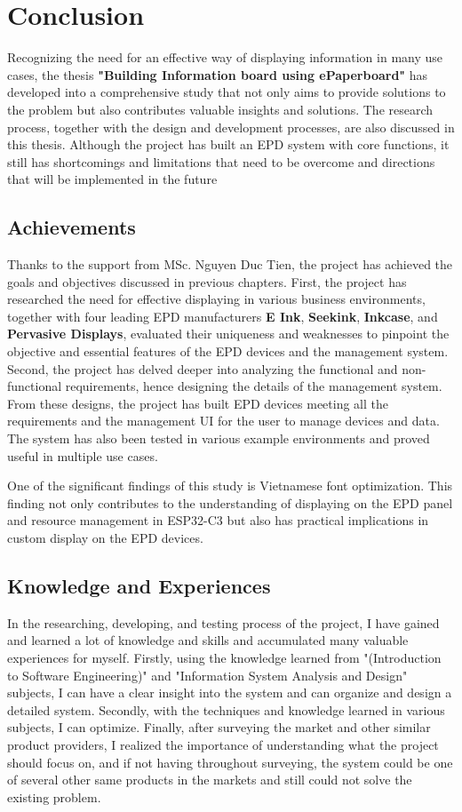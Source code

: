 \documentclass[../Main.tex]{subfiles}
\begin{document}
\section{Conclusion}
Recognizing the need for an effective way of displaying information in many use cases, the thesis \textbf{"Building Information board using ePaperboard"} has developed into a comprehensive study that not only aims to provide solutions to the problem but also contributes valuable insights and solutions. The research process, together with the design and development processes, are also discussed in this thesis. Although the project has built an EPD system with core functions, it still has shortcomings and limitations that need to be overcome and directions that will be implemented in the future

\subsection{Achievements}
Thanks to the support from MSc. Nguyen Duc Tien, the project has achieved the goals and objectives discussed in previous chapters. First, the project has researched the need for effective displaying in various business environments, together with four leading EPD manufacturers \textbf{E Ink}, \textbf{Seekink}, \textbf{Inkcase}, and \textbf{Pervasive Displays}, evaluated their uniqueness and weaknesses to pinpoint the objective and essential features of the EPD devices and the management system. Second, the project has delved deeper into analyzing the functional and non-functional requirements, hence designing the details of the management system. From these designs, the project has built EPD devices meeting all the requirements and the management UI for the user to manage devices and data. The system has also been tested in various example environments and proved useful in multiple use cases.

One of the significant findings of this study is Vietnamese font optimization. This finding not only contributes to the understanding of displaying on the EPD panel and resource management in ESP32-C3 but also has practical implications in custom display on the EPD devices.

\subsection{Knowledge and Experiences}
In the researching, developing, and testing process of the project, I have gained and learned a lot of knowledge and skills and accumulated many valuable experiences for myself. Firstly, using the knowledge learned from "(Introduction to Software Engineering)" and "Information System Analysis and Design" subjects, I can have a clear insight into the system and can organize and design a detailed system. Secondly, with the techniques and knowledge learned in various subjects, I can optimize. Finally, after surveying the market and other similar product providers, I realized the importance of understanding what the project should focus on, and if not having throughout surveying, the system could be one of several other same products in the markets and still could not solve the existing problem. 
\end{document}
